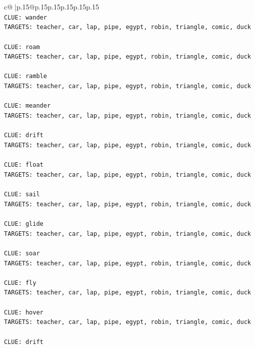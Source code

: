 \documentclass{article}
\begin{document}
{\begin{supertabular}{c@{$\;$}|p{.15\linewidth}@{}p{.15\linewidth}p{.15\linewidth}p{.15\linewidth}p{.15\linewidth}p{.15\linewidth}}
{{{\\ 
\texttt{CLUE: wander} \\
\texttt{TARGETS: teacher, car, lap, pipe, egypt, robin, triangle, comic, duck} \\
\\ 
\texttt{CLUE: roam} \\
\texttt{TARGETS: teacher, car, lap, pipe, egypt, robin, triangle, comic, duck} \\
\\ 
\texttt{CLUE: ramble} \\
\texttt{TARGETS: teacher, car, lap, pipe, egypt, robin, triangle, comic, duck} \\
\\ 
\texttt{CLUE: meander} \\
\texttt{TARGETS: teacher, car, lap, pipe, egypt, robin, triangle, comic, duck} \\
\\ 
\texttt{CLUE: drift} \\
\texttt{TARGETS: teacher, car, lap, pipe, egypt, robin, triangle, comic, duck} \\
\\ 
\texttt{CLUE: float} \\
\texttt{TARGETS: teacher, car, lap, pipe, egypt, robin, triangle, comic, duck} \\
\\ 
\texttt{CLUE: sail} \\
\texttt{TARGETS: teacher, car, lap, pipe, egypt, robin, triangle, comic, duck} \\
\\ 
\texttt{CLUE: glide} \\
\texttt{TARGETS: teacher, car, lap, pipe, egypt, robin, triangle, comic, duck} \\
\\ 
\texttt{CLUE: soar} \\
\texttt{TARGETS: teacher, car, lap, pipe, egypt, robin, triangle, comic, duck} \\
\\ 
\texttt{CLUE: fly} \\
\texttt{TARGETS: teacher, car, lap, pipe, egypt, robin, triangle, comic, duck} \\
\\ 
\texttt{CLUE: hover} \\
\texttt{TARGETS: teacher, car, lap, pipe, egypt, robin, triangle, comic, duck} \\
\\ 
\texttt{CLUE: drift} \\
}}}
\end{supertabular}}
\end{document}
